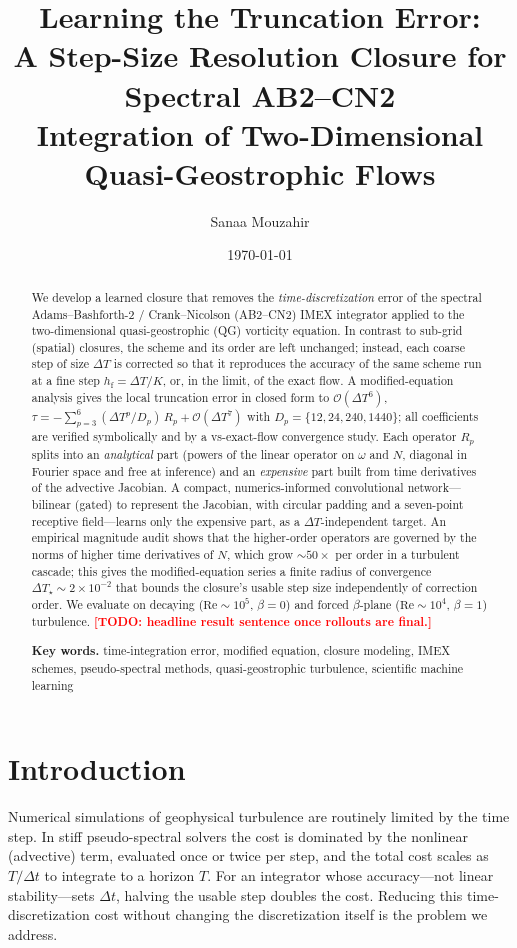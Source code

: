 \documentclass[11pt]{article}
\title{\bfseries Learning the Truncation Error:\\ A Step-Size Resolution Closure
for Spectral AB2--CN2\\ Integration of Two-Dimensional Quasi-Geostrophic Flows}
\author[1]{Sanaa Mouzahir}
\author[1]{\TODO{co-authors / advisor}}
\affil[1]{\small Department of Mechanical Engineering and Center for
Computational Science and Engineering,\\ Massachusetts Institute of Technology,
Cambridge, MA 02139}
\date{\today}
\theoremstyle{plain}
\theoremstyle{definition}
\newcommand{\TODO}[1]{\textcolor{red}{\textbf{[TODO: #1]}}}
\newcommand{\bO}{\mathcal{O}}
\newcommand{\DT}{\Delta T}
\newcommand{\hf}{h_{\mathrm{f}}}
\begin{document}
\maketitle

\begin{abstract}
\noindent
We develop a learned closure that removes the \emph{time-discretization} error
of the spectral Adams--Bashforth-2 / Crank--Nicolson (AB2--CN2) IMEX
integrator applied to the two-dimensional quasi-geostrophic (QG) vorticity
equation. In contrast to sub-grid (spatial) closures, the scheme and its order
are left unchanged; instead, each coarse step of size $\DT$ is corrected so
that it reproduces the accuracy of the same scheme run at a fine step
$\hf=\DT/K$, or, in the limit, of the exact flow. A modified-equation analysis
gives the local truncation error in closed form to $\bO(\DT^6)$,
$\tau=-\sum_{p=3}^{6}(\DT^p/D_p)\,R_p+\bO(\DT^7)$ with
$D_p=\{12,24,240,1440\}$; all coefficients are verified symbolically and by a
vs-exact-flow convergence study. Each operator $R_p$ splits into an
\emph{analytical} part (powers of the linear operator on $\omega$ and $N$,
diagonal in Fourier space and free at inference) and an \emph{expensive} part
built from time derivatives of the advective Jacobian. A compact,
numerics-informed convolutional network---bilinear (gated) to represent the
Jacobian, with circular padding and a seven-point receptive field---learns only
the expensive part, as a $\DT$-independent target. An empirical magnitude audit
shows that the higher-order operators are governed by the norms of higher time
derivatives of $N$, which grow $\sim\!50\times$ per order in a turbulent
cascade; this gives the modified-equation series a finite radius of convergence
$\DT_\star\!\sim\!2\times10^{-2}$ that bounds the closure's usable step size
independently of correction order. We evaluate on decaying
($\mathrm{Re}\!\sim\!10^5$, $\beta=0$) and forced $\beta$-plane
($\mathrm{Re}\!\sim\!10^4$, $\beta=1$) turbulence.
\TODO{headline result sentence once rollouts are final.}

\smallskip
\noindent\textbf{Key words.} time-integration error, modified equation,
closure modeling, IMEX schemes, pseudo-spectral methods, quasi-geostrophic
turbulence, scientific machine learning
\end{abstract}

\section{Introduction}
\label{sec:intro}
Numerical simulations of geophysical turbulence are routinely limited by the
time step. In stiff pseudo-spectral solvers the cost is dominated by the
nonlinear (advective) term, evaluated once or twice per step, and the total
cost scales as $T/\Delta t$ to integrate to a horizon $T$. For an integrator
whose accuracy---not linear stability---sets $\Delta t$, halving the usable
step doubles the cost. Reducing this time-discretization cost without changing
the discretization itself is the problem we address.
\end{document}
